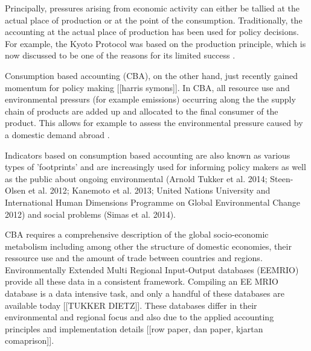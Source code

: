 Principally, pressures arising from economic activity can either be tallied at
the actual place of production or at the point of the consumption.
Traditionally, the accounting at the actual place of production has been used
for policy decisions. For example, the Kyoto Protocol was based on the
production principle, which is now discussed to be one of the reasons for its
limited success \cite{23192129}. 

Consumption based accounting (CBA), on the other hand, just recently gained
momentum for policy making [[harris symons]]. In CBA, all resource use and environmental
pressurs (for example emissions) occurring along the the supply chain of
products are added up and allocated to the final consumer of the product. This
allows for example to assess the environmental pressure caused by a domestic
demand abroad \cite{Weinzettel_2013}\cite{20212122}.

Indicators based on consumption based accounting are also known as various
types of 'footprints' and are increasingly used for informing policy makers as
well as the public about ongoing environmental (Arnold Tukker et al. 2014;
Steen-Olsen et al. 2012; Kanemoto et al. 2013; United Nations University and
International Human Dimensions Programme on Global Environmental Change 2012)
and social problems (Simas et al. 2014). 

CBA requires a comprehensive description of the global socio-economic
metabolism including among other the structure of domestic economies, their
ressource use and the amount of trade between countries and regions.
Environmentally Extended Multi Regional Input-Output databases (EEMRIO) provide
all these data in a consistent framework. Compiling an EE MRIO database is a
data intensive task, and only a handful of these databases are available today
[[TUKKER DIETZ]]. These databases differ in their environmental and regional
focus and also due to the applied accounting principles and implementation
details [[row paper, dan paper, kjartan comaprison]]. 